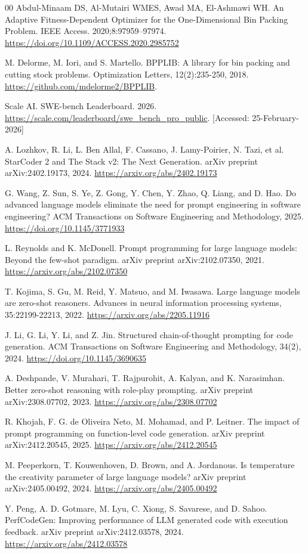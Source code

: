 \documentclass[11pt]{article}
\begin{document}
\begin{thebibliography}{00}
 Abdul-Minaam DS, Al-Mutairi WMES, Awad MA, El-Ashmawi WH. An Adaptive Fitness-Dependent Optimizer for the One-Dimensional Bin Packing Problem. IEEE Access. 2020;8:97959--97974. \url{https://doi.org/10.1109/ACCESS.2020.2985752}

 M. Delorme, M. Iori, and S. Martello. BPPLIB: A library for bin packing and cutting stock problems. Optimization Letters, 12(2):235-250, 2018. \url{https://github.com/mdelorme2/BPPLIB}.

 Scale AI. SWE-bench Leaderboard. 2026. \url{https://scale.com/leaderboard/swe_bench_pro_public}. [Accessed: 25-February-2026]

 A. Lozhkov, R. Li, L. Ben Allal, F. Cassano, J. Lamy-Poirier, N. Tazi, et al. StarCoder 2 and The Stack v2: The Next Generation. arXiv preprint arXiv:2402.19173, 2024. \url{https://arxiv.org/abs/2402.19173}

 G. Wang, Z. Sun, S. Ye, Z. Gong, Y. Chen, Y. Zhao, Q. Liang, and D. Hao. Do advanced language models eliminate the need for prompt engineering in software engineering? ACM Transactions on Software Engineering and Methodology, 2025. \url{https://doi.org/10.1145/3771933}

 L. Reynolds and K. McDonell. Prompt programming for large language models: Beyond the few-shot paradigm. arXiv preprint arXiv:2102.07350, 2021. \url{https://arxiv.org/abs/2102.07350}

 T. Kojima, S. Gu, M. Reid, Y. Matsuo, and M. Iwasawa. Large language models are zero-shot reasoners. Advances in neural information processing systems, 35:22199-22213, 2022. \url{https://arxiv.org/abs/2205.11916}

 J. Li, G. Li, Y. Li, and Z. Jin. Structured chain-of-thought prompting for code generation. ACM Transactions on Software Engineering and Methodology, 34(2), 2024. \url{https://doi.org/10.1145/3690635}

 A. Deshpande, V. Murahari, T. Rajpurohit, A. Kalyan, and K. Narasimhan. Better zero-shot reasoning with role-play prompting. arXiv preprint arXiv:2308.07702, 2023. \url{https://arxiv.org/abs/2308.07702}

 R. Khojah, F. G. de Oliveira Neto, M. Mohamad, and P. Leitner. The impact of prompt programming on function-level code generation. arXiv preprint arXiv:2412.20545, 2025. \url{https://arxiv.org/abs/2412.20545}

 M. Peeperkorn, T. Kouwenhoven, D. Brown, and A. Jordanous. Is temperature the creativity parameter of large language models? arXiv preprint arXiv:2405.00492, 2024. \url{https://arxiv.org/abs/2405.00492}

 Y. Peng, A. D. Gotmare, M. Lyu, C. Xiong, S. Savarese, and D. Sahoo. PerfCodeGen: Improving performance of LLM generated code with execution feedback. arXiv preprint arXiv:2412.03578, 2024. \url{https://arxiv.org/abs/2412.03578}

\end{thebibliography}
\end{document}

